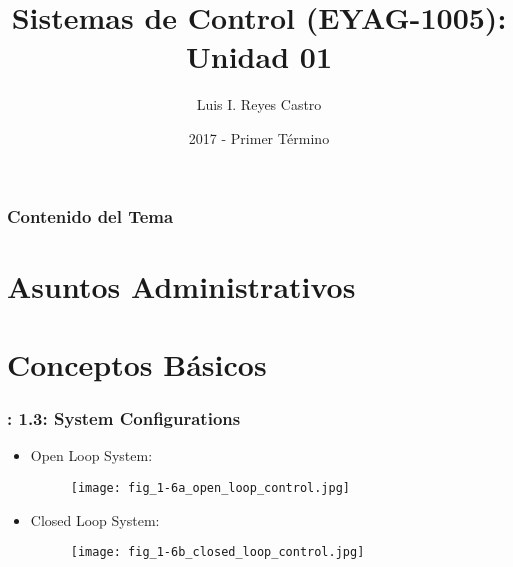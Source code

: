 \documentclass[ 10pt, xcolor = dvipsnames]{beamer}
\title[Sistemas de Control: Unidad 01]{Sistemas de Control (EYAG-1005): \textbf{Unidad 01} }
\author[L. I. Reyes Castro]{Luis I. Reyes Castro}
\institute[ESPOL]{\normalsize Escuela Superior Polit\'ecnica del Litoral (ESPOL) \\ Guayaquil - Ecuador}
\date[2017-T1]{2017 - Primer T\'ermino}
\begin{document}
\begin{frame}[noframenumbering]
\titlepage
\end{frame}
\begin{frame}[noframenumbering]
\frametitle{Contenido del Tema}
\tableofcontents[ subsectionstyle = hide]
\end{frame}

\section{Asuntos Administrativos}

\section{Conceptos B\'asicos}

\begin{frame}[allowframebreaks]
\frametitle{\insertsection: 1.3: System Configurations}

\begin{itemize}
\item Open Loop System: 
\begin{figure}
\centering
\texttt{[image: fig\_1-6a\_open\_loop\_control.jpg]}
\end{figure}
\item Closed Loop System: 
\begin{figure}
\centering
\texttt{[image: fig\_1-6b\_closed\_loop\_control.jpg]}
\end{figure}
\end{itemize}

\end{frame}
\end{document}
